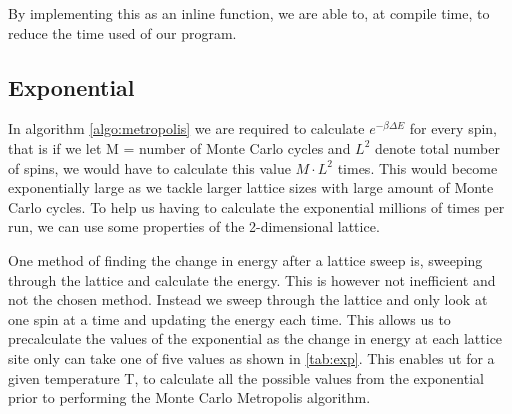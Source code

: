 \documentclass[%
reprint,
nofootinbib,
amsmath,amssymb,
aps,
]{revtex4-1}
\begin{document}
By implementing this as an inline function, we are able to, at compile time, to reduce the time used of our program. 

\subsection{Exponential}  %
In algorithm \ref{algo:metropolis} we are required to calculate $e^{-\beta\Delta E}$ for every spin, that is if we let M = number of Monte Carlo cycles and $L^2$ denote total number of spins, we would have to calculate this value $M\cdot L^2$ times. This would become exponentially large as we tackle larger lattice sizes with large amount of Monte Carlo cycles. To help us having to calculate the exponential millions of times per run, we can use some properties of the 2-dimensional lattice. 

One method of finding the change in energy after a lattice sweep is, sweeping through the lattice and calculate the energy. This is however not inefficient and not the chosen method. Instead we sweep through the lattice and only look at one spin at a time and updating the energy each time. This allows us to precalculate the values of the exponential as the change in energy at each lattice site only can take one of five values as shown in \autoref{tab:exp}. This enables ut for a given temperature T, to calculate all the possible values from the exponential prior to performing the Monte Carlo Metropolis algorithm. 
\end{document}
